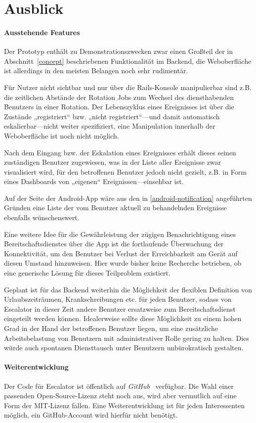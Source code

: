 \documentclass[11pt,utf8,notoc,bibnum,german,final]{zihpub}
\begin{document}
\section{Ausblick}

\paragraph{Ausstehende Features}

Der Prototyp enthält zu Demonstrationszwecken zwar einen Großteil der in
Abschnitt~\ref{concept} beschriebenen Funktionalität im Backend, die
Weboberfläche ist allerdings in den meisten Belangen noch sehr rudimentär.

Für Nutzer nicht sichtbar und nur über die Rails-Konsole manipulierbar sind
z.B. die zeitlichen Abstände der Rotation Jobs zum Wechsel des diensthabenden
Benutzers in einer Rotation. Der Lebenszyklus eines Ereignisses ist über die
Zustände „registriert“ bzw. „nicht registriert“—und damit automatisch
eskalierbar—nicht weiter spezifiziert, eine Manipulation innerhalb der
Weboberfläche ist noch nicht möglich.

Nach dem Eingang bzw. der Eskalation eines Ereignisses erhält dieses seinen
zuständigen Benutzer zugewiesen, was in der Liste aller Ereignisse zwar
visualisiert wird, für den betroffenen Benutzer jedoch nicht gezielt, z.B. in
Form eines Dashboards von „eigenen“ Ereignissen—einsehbar ist.

Auf der Seite der Android-App wäre aus den in \ref{android-notification}
angeführten Gründen eine Liste der vom Benutzer aktuell zu behandelnden
Ereignisse ebenfalls wünschenswert.

Eine weitere Idee für die Gewährleistung der zügigen Benachrichtigung eines
Bereitschaftsdienstes über die App ist die fortlaufende Überwachung der
Konnektivität, um den Benutzer bei Verlust der Erreichbarkeit am Gerät auf
diesen Umstand hinzuweisen. Hier wurde bisher keine Recherche betrieben, ob
eine generische Lösung für dieses Teilproblem existiert.

Geplant ist für das Backend weiterhin die Möglichkeit der flexiblen Definition
von Urlaubszeiträumen, Krankschreibungen etc. für jeden Benutzer, sodass von
Escalator in dieser Zeit andere Benutzer ersatzweise zum Bereitschaftsdienst
eingeteilt werden können. Idealerweise sollte diese Möglichkeit zu einem hohen
Grad in der Hand der betroffenen Benutzer liegen, um eine zusätzliche
Arbeitsbelastung von Benutzern mit administrativer Rolle gering zu halten. Dies
würde auch spontanen Diensttausch unter Benutzern unbürokratisch gestalten.


\paragraph{Weiterentwicklung}

Der Code für Escalator ist öffentlich auf \emph{GitHub}~\cite{escalator-github}
verfügbar. Die Wahl einer passenden Open-Source-Lizenz steht noch aus, wird
aber vermutlich auf eine Form der MIT-Lizenz fallen. Eine Weiterentwicklung ist
für jeden Interessenten möglich, ein GitHub-Account wird hierfür nicht benötigt.
\end{document}
